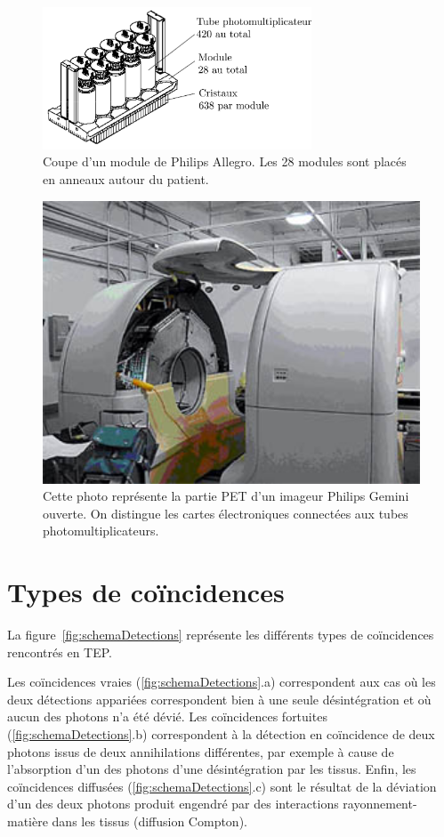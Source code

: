 \begin{figure}
\centering
\includegraphics[width=8cm]{images/coupe_module}
\caption[Coupe d'un module de Philips Allegro]{Coupe d'un module de Philips Allegro. Les 28 modules sont placés en anneaux autour du patient.}
\label{fig:moduleTEP}
\end{figure}


\begin{figure}
\centering
\includegraphics[width=12cm]{images/gemini_eclate}
\caption[Photo d'un imageur philips Gemini ouvert]{Cette photo représente la partie PET d'un imageur Philips Gemini ouverte. On distingue les cartes électroniques connectées aux tubes photomultiplicateurs.}
\label{fig:gemini_ecl}
\end{figure}

	\section{Types de coïncidences}

La figure~\ref{fig:schemaDetections} représente les différents types de coïncidences rencontrés en TEP.

Les coïncidences vraies (\ref{fig:schemaDetections}.a) correspondent aux cas où les deux détections appariées correspondent bien à une seule désintégration et où aucun des photons n'a été dévié. Les coïncidences fortuites (\ref{fig:schemaDetections}.b) correspondent à la détection en coïncidence de deux photons issus de deux annihilations différentes, par exemple à cause de l’absorption d’un des photons d’une désintégration par les tissus. Enfin, les coïncidences diffusées (\ref{fig:schemaDetections}.c) sont le résultat de la déviation d'un des deux photons produit engendré par des interactions rayonnement-matière dans les tissus (diffusion Compton). 

